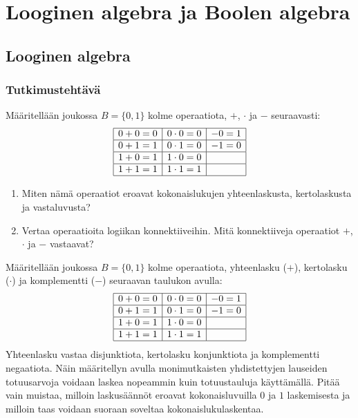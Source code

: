 \chapter{Looginen algebra ja Boolen algebra}%

\section{Looginen algebra}

\subsection*{Tutkimustehtävä}

Määritellään joukossa $B=\{0, 1\}$ kolme operaatiota, $+$, $\cdot$ ja $-$ seuraavasti:
\[
\begin{array}{|c|c|c|}
\hline
0+0=0 & 0\cdot0=0 & - 0=1\\
\hline
0+1=1 & 0\cdot1=0 & - 1=0\\
\hline
1+0=1 & 1\cdot0=0 & \\
\hline
1+1=1 & 1\cdot1=1 & \\
\hline

\end{array}
\]
\begin{enumerate}
\item Miten nämä operaatiot eroavat kokonaislukujen yhteenlaskusta, kertolaskusta ja vastaluvusta?
\item Vertaa operaatioita logiikan konnektiiveihin. Mitä konnektiiveja operaatiot $+$, $\cdot$ ja $-$ vastaavat?
\end{enumerate}

Määritellään joukossa $B=\{0, 1\}$ kolme operaatiota, yhteenlasku ($+$), kertolasku ($\cdot$) ja komplementti ($-$) seuraavan taulukon avulla:
\[
\begin{array}{|c|c|c|}
\hline
0+0=0 & 0\cdot0=0 & - 0=1\\
\hline
0+1=1 & 0\cdot1=0 & - 1=0\\
\hline
1+0=1 & 1\cdot0=0 & \\
\hline
1+1=1 & 1\cdot1=1 & \\
\hline
\end{array}
\]
Yhteenlasku vastaa disjunktiota, kertolasku konjunktiota ja komplementti negaatiota. Näin määritellyn  avulla monimutkaisten yhdistettyjen lauseiden totuusarvoja voidaan laskea nopeammin kuin totuustauluja käyttämällä. Pitää vain muistaa, milloin lasku\-sään\-nöt eroavat kokonaisluvuilla $0$ ja $1$ laskemisesta ja milloin taas voidaan suoraan soveltaa kokonaislukulaskentaa.


